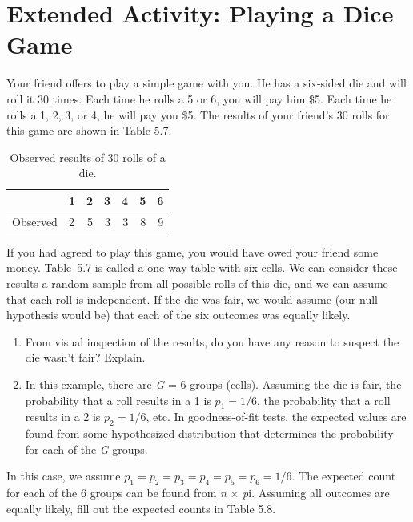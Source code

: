 \documentclass[
]{report}
\providecommand{\tightlist}{%
  \setlength{\itemsep}{0pt}\setlength{\parskip}{0pt}}
\begin{document}
\hypertarget{extended-activity-playing-a-dice-game}{%
\section*{Extended Activity: Playing a Dice Game}\label{extended-activity-playing-a-dice-game}}

Your friend offers to play a simple game with you. He has a six‑sided die and will roll it 30 times. Each time he rolls a 5 or 6, you will pay him \$5. Each time he rolls a 1, 2, 3, or 4, he will pay you \$5. The results of your friend's 30 rolls for this game are shown in Table 5.7.

\begin{table}[!h]
\centering
\caption{\label{tab:tab7}Observed results of 30 rolls of a die.}
\centering
\begin{tabular}[t]{llrrrrr}
\toprule
  & 1 & 2 & 3 & 4 & 5 & 6\\
\midrule
Observed & 2 & 5 & 3 & 3 & 8 & 9\\
\bottomrule
\end{tabular}
\end{table}

If you had agreed to play this game, you would have owed your friend some money. Table~5.7 is called a one-way table with six cells. We can consider these results a random sample from all possible rolls of this die, and we can assume that each roll is independent. If the die was fair, we would assume (our null hypothesis would be) that each of the six outcomes was equally likely.

\begin{enumerate}
\def\labelenumi{\arabic{enumi}.}
\setcounter{enumi}{31}
\tightlist
\item
  From visual inspection of the results, do you have any reason to suspect the die wasn't fair? Explain.\\
\item
  In this example, there are \emph{G} = 6 groups (cells). Assuming the die is fair, the probability that a roll results in a 1 is \(p_1 = 1/6\), the probability that a roll results in a 2 is \(p_2 = 1/6\), etc. In goodness-of-fit tests, the expected values are found from some hypothesized distribution that determines the probability for each of the \emph{G} groups.
\end{enumerate}

In this case, we assume \(p_1 = p_2 = p_3 = p_4 = p_5 = p_6 = 1/6\). The expected count for each of the 6 groups can be found from \emph{n} × \emph{p}i. Assuming all outcomes are equally likely, fill out the expected counts in Table 5.8.
\end{document}
